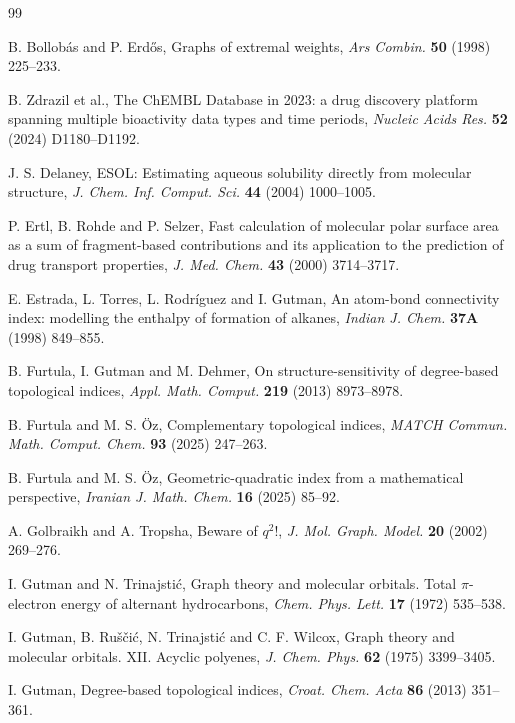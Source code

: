 \documentclass[11pt,a4paper]{article}
\theoremstyle{plain}
\theoremstyle{definition}
\theoremstyle{remark}
\begin{document}
\begin{thebibliography}{99}

B. Bollob\'as and P. Erd\H{o}s, Graphs of extremal weights,
\emph{Ars Combin.} \textbf{50} (1998) 225--233.

B. Zdrazil et al., The ChEMBL Database in 2023: a drug discovery platform
spanning multiple bioactivity data types and time periods,
\emph{Nucleic Acids Res.} \textbf{52} (2024) D1180--D1192.

J. S. Delaney, ESOL: Estimating aqueous solubility directly from molecular
structure, \emph{J. Chem. Inf. Comput. Sci.} \textbf{44} (2004) 1000--1005.

P. Ertl, B. Rohde and P. Selzer, Fast calculation of molecular polar surface area
as a sum of fragment-based contributions and its application to the prediction of
drug transport properties, \emph{J. Med. Chem.} \textbf{43} (2000) 3714--3717.

E. Estrada, L. Torres, L. Rodr\'iguez and I. Gutman, An atom-bond connectivity
index: modelling the enthalpy of formation of alkanes,
\emph{Indian J. Chem.} \textbf{37A} (1998) 849--855.

B. Furtula, I. Gutman and M. Dehmer, On structure-sensitivity of degree-based
topological indices, \emph{Appl. Math. Comput.} \textbf{219} (2013) 8973--8978.

B. Furtula and M. S. \"Oz, Complementary topological indices,
\emph{MATCH Commun. Math. Comput. Chem.} \textbf{93} (2025) 247--263.

B. Furtula and M. S. \"Oz, Geometric-quadratic index from a mathematical
perspective, \emph{Iranian J. Math. Chem.} \textbf{16} (2025) 85--92.

A. Golbraikh and A. Tropsha, Beware of $q^2$!,
\emph{J. Mol. Graph. Model.} \textbf{20} (2002) 269--276.

I. Gutman and N. Trinajsti\'c, Graph theory and molecular orbitals. Total
$\pi$-electron energy of alternant hydrocarbons,
\emph{Chem. Phys. Lett.} \textbf{17} (1972) 535--538.

I. Gutman, B. Ru\v{s}\v{c}i\'c, N. Trinajsti\'c and C. F. Wilcox, Graph theory
and molecular orbitals. XII. Acyclic polyenes,
\emph{J. Chem. Phys.} \textbf{62} (1975) 3399--3405.

I. Gutman, Degree-based topological indices,
\emph{Croat. Chem. Acta} \textbf{86} (2013) 351--361.


\end{thebibliography}
\end{document}
